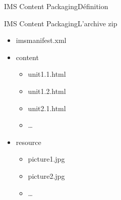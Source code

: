 \documentclass[xcolor=x11names,compress]{beamer}
\renewcommand{\(}{\begin{columns}}
\renewcommand{\)}{\end{columns}}
\newcommand{\<}[1]{\begin{column}{#1}}
\renewcommand{\>}{\end{column}}
\begin{document}
\begin{frame}{IMS Content Packaging}{Définition}
  \pause
\end{frame}

\begin{frame}{IMS Content Packaging}{L'archive zip}
  \begin{itemize}
	\item imsmanifest.xml
	\item content
	  \begin{itemize}
		\item unit1.1.html
		\item unit1.2.html
		\item unit2.1.html
		\item \ldots
	  \end{itemize}
	\item resource
	  \begin{itemize}
		\item picture1.jpg
		\item picture2.jpg
		\item \ldots
	  \end{itemize}
  \end{itemize}
\end{frame}
\end{document}

